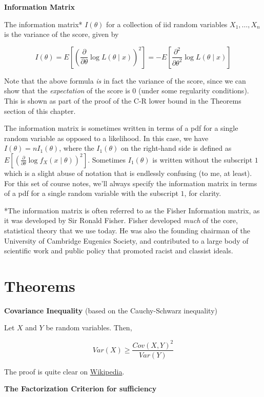\documentclass[
  letterpaper,
  DIV=11,
  numbers=noendperiod]{scrreprt}
\begin{document}
\textbf{Information Matrix}

The information matrix* \(I(\theta)\) for a collection of iid random
variables \(X_1, \dots, X_n\) is the variance of the score, given by

\[
I(\theta) = E \left[ \left( \frac{\partial}{\partial \theta} \log L(\theta \mid x) \right)^2\right] = -E\left[ \frac{\partial^2}{\partial \theta^2} \log L(\theta \mid x)\right]
\]

Note that the above formula \emph{is} in fact the variance of the score,
since we can show that the \emph{expectation} of the score is 0 (under
some regularity conditions). This is shown as part of the proof of the
C-R lower bound in the Theorems section of this chapter.

The information matrix is sometimes written in terms of a pdf for a
single random variable as opposed to a likelihood. In this case, we have
\(I(\theta) = n I_1(\theta)\), where the \(I_1(\theta)\) on the
right-hand side is defined as
\(E \left[ \left( \frac{\partial}{\partial \theta} \log f_X(x \mid \theta) \right)^2\right]\).
Sometimes \(I_1(\theta)\) is written without the subscript \(1\) which
is a slight abuse of notation that is endlessly confusing (to me, at
least). For this set of course notes, we'll always specify the
information matrix in terms of a pdf for a single random variable with
the subscript \(1\), for clarity.

*The information matrix is often referred to as the Fisher Information
matrix, as it was developed by Sir Ronald Fisher. Fisher developed
\emph{much} of the core, statistical theory that we use today. He was
also the founding chairman of the University of Cambridge Eugenics
Society, and contributed to a large body of scientific work and public
policy that promoted racist and classist ideals.

\section{Theorems}\label{theorems-3}

\textbf{Covariance Inequality} (based on the Cauchy-Schwarz inequality)

Let \(X\) and \(Y\) be random variables. Then,

\[
Var(X) \geq \frac{Cov(X, Y)^2}{Var(Y)}
\]

The proof is quite clear on
\href{https://en.wikipedia.org/wiki/Cauchy\%E2\%80\%93Schwarz_inequality}{Wikipedia}.

\textbf{The Factorization Criterion for sufficiency}
\end{document}
